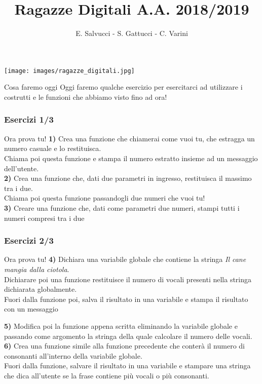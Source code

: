 \documentclass{beamer}
\title[Ragazze Digitali 2019]{Ragazze Digitali A.A. 2018/2019}
\author{E. Salvucci - S. Gattucci - C. Varini}
\date{}
\begin{document}
{\texttt{[image: images/ragazze\_digitali.jpg]}}
\begin{frame}
\end{frame}


\begin{frame}{Cosa faremo oggi}
    \vspace{0.8cm}
      Oggi faremo qualche esercizio per esercitarci ad utilizzare i costrutti e le funzioni che abbiamo visto fino ad ora!
\end{frame}


\begin{frame}[fragile]
\frametitle{Esercizi 1/3}
	\begin{block}{Ora prova tu!}
		\textbf{1)} Crea una funzione che chiamerai come vuoi tu, che estragga un numero casuale e lo restituisca.\\
		Chiama poi questa funzione e stampa il numero estratto insieme ad un messaggio dell'utente.\\
		\textbf{2)} Crea una funzione che, dati due parametri in ingresso, restituisca il massimo tra i due. \\
		Chiama poi questa funzione passandogli due numeri che vuoi tu!\\
		\textbf{3)} Creare una funzione che, dati come parametri due numeri, stampi tutti i numeri compresi tra i due\\
		
	\end{block}
\end{frame}

\begin{frame}[fragile]
\frametitle{Esercizi 2/3}
\begin{block}{Ora prova tu!}
	\textbf{4)} Dichiara una variabile globale che contiene la stringa \textit{Il cane mangia dalla ciotola}.\\ Dichiarare poi una funzione restituisce il numero di vocali presenti nella stringa dichiarata globalmente.\\
	Fuori dalla funzione poi, salva il risultato in una variabile e stampa il risultato con un messaggio
	
	\textbf{5)} Modifica poi la funzione appena scritta eliminando la variabile globale e passando come argomento la stringa della quale calcolare il numero delle vocali.\\
	\textbf{6)} Crea una funzione simile alla funzione precedente che conterà il numero di consonanti all'interno della variabile globale.\\
	Fuori dalla funzione, salvare il risultato in una variabile e stampare una stringa che dica all'utente se la frase contiene più vocali o più consonanti.\\
\end{block}
\end{frame}
\end{document}
